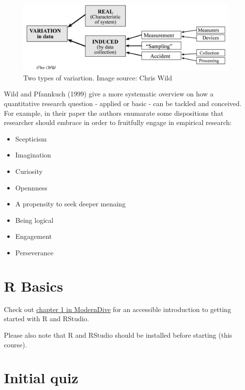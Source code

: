 \documentclass[
  letterpaper,
  DIV=11,
  numbers=noendperiod]{scrreprt}
\providecommand{\tightlist}{%
  \setlength{\itemsep}{0pt}\setlength{\parskip}{0pt}}\usepackage{longtable,booktabs,array}
\theoremstyle{definition}
\theoremstyle{definition}
\theoremstyle{remark}
\begin{document}
\begin{figure}

{\centering \includegraphics{./img/variation.png}

}

\caption{\label{fig-variation}Two types of variartion. Image source:
Chris Wild}

\end{figure}

Wild and Pfannkuch (1999) give a more systematic overview on how a
quantitative research question - applied or basic - can be tackled and
conceived. For example, in their paper the authors enumarate some
dispositions that researcher should embrace in order to fruitfully
engage in empirical research:

\begin{itemize}
\tightlist
\item
  Scepticism
\item
  Imagination
\item
  Curiosity
\item
  Opennness
\item
  A propensity to seek deeper menaing
\item
  Being logical
\item
  Engagement
\item
  Perseverance
\end{itemize}

\hypertarget{r-basics}{%
\section{R Basics}\label{r-basics}}

Check out \href{https://moderndive.com/1-getting-started.html}{chapter 1
in ModernDive} for an accessible introduction to getting started with R
and RStudio.

Please also note that R and RStudio should be installed before starting
(this course).

\hypertarget{initial-quiz}{%
\section{Initial quiz}\label{initial-quiz}}
\end{document}
